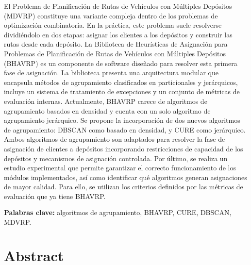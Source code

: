 \documentclass[12pt,letterpaper,oneside]{report}
\begin{document}
El Problema de Planificaci\'on de Rutas de Veh\'iculos con M\'ultiples Dep\'ositos (MDVRP) constituye una variante compleja dentro de los problemas de optimizaci\'on combinatoria. En la pr\'actica, este problema suele resolverse dividi\'endolo en dos etapas: asignar los clientes a los dep\'ositos y construir las rutas desde cada dep\'osito. La Biblioteca de Heur\'isticas de Asignaci\'on para Problemas de Planificaci\'on de Rutas de Veh\'iculos con M\'ultiples Dep\'ositos (BHAVRP) es un componente de software dise\~nado para resolver esta primera fase de asignaci\'on. La biblioteca presenta una arquitectura modular que encapsula m\'etodos de agrupamiento clasificados en particionales y jer\'arquicos, incluye un sistema de tratamiento de excepciones y un conjunto de m\'etricas de evaluaci\'on internas. Actualmente, BHAVRP carece de algoritmos de agrupamiento basados en densidad y cuenta con un solo algoritmo de agrupamiento jer\'arquico. Se propone la incorporaci\'on de dos nuevos algoritmos de agrupamiento: DBSCAN como basado en densidad, y CURE como jer\'arquico. Ambos algoritmos de agrupamiento son adaptados para resolver la fase de asignaci\'on de clientes a dep\'ositos incorporando restricciones de capacidad de los dep\'ositos y mecanismos de asignaci\'on controlada. Por \'ultimo, se realiza un estudio experimental que permite garantizar el correcto funcionamiento de los m\'odulos implementados, as\'i como identificar qu\'e algoritmos generan asignaciones de mayor calidad. Para ello, se utilizan los criterios definidos por las m\'etricas de evaluaci\'on que ya tiene BHAVRP.

\vspace{12pt}
\noindent\textbf{Palabras clave:} algoritmos de agrupamiento, BHAVRP, CURE, DBSCAN, MDVRP.

\chapter*{Abstract}
\end{document}
